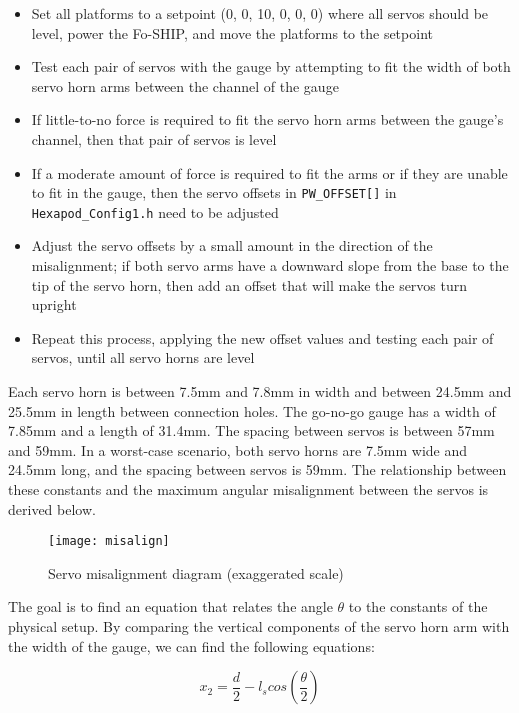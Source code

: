 \documentclass[11pt]{ucthesisCP}
\begin{document}
\begin{itemize}[noitemsep,topsep=0pt]
	\item Set all platforms to a setpoint (0, 0, 10, 0, 0, 0) where all servos should be level, power the Fo-SHIP, and move the platforms to the setpoint
	\item Test each pair of servos with the gauge by attempting to fit the width of both servo horn arms between the channel of the gauge
	\item If little-to-no force is required to fit the servo horn arms between the gauge’s channel, then that pair of servos is level
	\item If a moderate amount of force is required to fit the arms or if they are unable to fit in the gauge, then the servo offsets in \verb|PW_OFFSET[]| in \verb|Hexapod_Config1.h| need to be adjusted
	\item Adjust the servo offsets by a small amount in the direction of the misalignment; if both servo arms have a downward slope from the base to the tip of the servo horn, then add an offset that will make the servos turn upright
	\item Repeat this process, applying the new offset values and testing each pair of servos, until all servo horns are level
\end{itemize}

Each servo horn is between 7.5mm and 7.8mm in width and between 24.5mm and 25.5mm in length between connection holes. The go-no-go gauge has a width of 7.85mm and a length of 31.4mm. The spacing between servos is between 57mm and 59mm. In a worst-case scenario, both servo horns are 7.5mm wide and 24.5mm long, and the spacing between servos is 59mm. The relationship between these constants and the maximum angular misalignment between the servos is derived below.

\begin{figure}[htbp]
	\centering
	\texttt{[image: misalign]}
	\caption{Servo misalignment diagram (exaggerated scale)}
	\label{fig:misalign}
\end{figure}

The goal is to find an equation that relates the angle $\theta$ to the constants of the physical setup. By comparing the vertical components of the servo horn arm with the width of the gauge, we can find the following equations:

\begin{equation}\label{eq:2eq14}
	x_2 = \frac{d}{2} - l_s cos(\frac{\theta}{2})
\end{equation}
\end{document}
